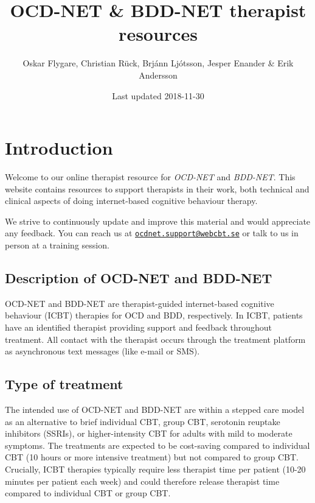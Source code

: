 \documentclass[]{book}
\title{OCD-NET \& BDD-NET therapist resources}
\author{Oskar Flygare, Christian Rück, Brjánn Ljótsson, Jesper Enander \& Erik
Andersson}
\date{Last updated 2018-11-30}
\theoremstyle{definition}
\theoremstyle{definition}
\theoremstyle{definition}
\theoremstyle{remark}
\begin{document}
\maketitle

{
\setcounter{tocdepth}{1}
\tableofcontents
}
\hypertarget{introduction}{%
\chapter{Introduction}\label{introduction}}

Welcome to our online therapist resource for \emph{OCD-NET} and
\emph{BDD-NET}. This website contains resources to support therapists in
their work, both technical and clinical aspects of doing internet-based
cognitive behaviour therapy.

We strive to continuously update and improve this material and would
appreciate any feedback. You can reach us at
\href{mailto:ocdnet.support@webcbt.se}{\nolinkurl{ocdnet.support@webcbt.se}}
or talk to us in person at a training session.

\hypertarget{description-of-ocd-net-and-bdd-net}{%
\section{Description of OCD-NET and
BDD-NET}\label{description-of-ocd-net-and-bdd-net}}

OCD-NET and BDD-NET are therapist-guided internet-based cognitive
behaviour (ICBT) therapies for OCD and BDD, respectively. In ICBT,
patients have an identified therapist providing support and feedback
throughout treatment. All contact with the therapist occurs through the
treatment platform as asynchronous text messages (like e-mail or SMS).

\hypertarget{type-of-treatment}{%
\section{Type of treatment}\label{type-of-treatment}}

The intended use of OCD-NET and BDD-NET are within a stepped care model
as an alternative to brief individual CBT, group CBT, serotonin reuptake
inhibitors (SSRIs), or higher-intensity CBT for adults with mild to
moderate symptoms. The treatments are expected to be cost-saving
compared to individual CBT (10 hours or more intensive treatment) but
not compared to group CBT. Crucially, ICBT therapies typically require
less therapist time per patient (10-20 minutes per patient each week)
and could therefore release therapist time compared to individual CBT or
group CBT.
\end{document}
